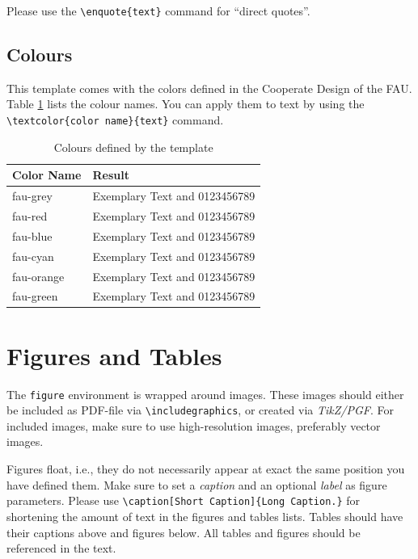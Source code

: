 Please use the \texttt{\textbackslash enquote\{text\}} command for \enquote{direct quotes}.

\subsection{Colours}
This template comes with the colors defined in the Cooperate Design of the FAU. Table \ref{tab:colours} lists the colour names. You can apply them to text by using the  \\ \texttt{\textbackslash textcolor\{color name\}\{text\}} command.
	
\begin{table}
\caption[Colours]{Colours defined by the template}
\label{tab:colours}
	\centering
		\begin{tabular}{@{}ll@{}}
			\toprule
			{\bf Color Name} & {\bf Result} \\ \midrule
			fau-grey      & \textcolor{fau-grey}{Exemplary Text and 0123456789}  \\
			fau-red      & \textcolor{fau-red}{Exemplary Text and 0123456789}  \\
			fau-blue      & \textcolor{fau-blue}{Exemplary Text and 0123456789}  \\
			fau-cyan    & \textcolor{fau-cyan}{Exemplary Text and 0123456789}  \\
			fau-orange      & \textcolor{fau-orange}{Exemplary Text and 0123456789}  \\
			fau-green      & \textcolor{fau-green}{Exemplary Text and 0123456789}  \\ \midrule
		\end{tabular}
\end{table}


\section{Figures and Tables}

The \texttt{figure} environment is wrapped around images. These images should either be included as PDF-file via \texttt{\textbackslash includegraphics}, or created via \textit{TikZ/PGF}. For included images, make sure to use high-resolution images, preferably vector images.

Figures float, i.e., they do not necessarily appear at exact the same position you have defined them. Make sure to set a  \textit{caption} and an optional \textit{label} as figure parameters. Please use \texttt{\textbackslash caption[Short Caption]\{Long Caption.\}} for shortening the amount of text in the figures and tables lists. Tables should have their captions above and figures below. All tables and figures should be referenced in the text.

